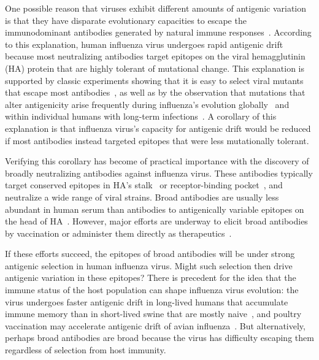 \documentclass[11pt]{article}
\begin{document}
One possible reason that viruses exhibit different amounts of antigenic variation is that they have disparate evolutionary capacities to escape the immunodominant antibodies generated by natural immune responses~\citep{lipsitch2007patterns,cobey2014pathogen,fulton2015mutational}.
According to this explanation, human influenza virus undergoes rapid antigenic drift because most neutralizing antibodies target epitopes on the viral hemagglutinin (HA) protein that are highly tolerant of mutational change.
This explanation is supported by classic experiments showing that it is easy to select viral mutants that escape most antibodies~\citep{yewdell1979antigenic,webster1980determination}, as well as by the observation that mutations that alter antigenicity arise frequently during influenza's evolution globally~\citep{koel2013substitutions,chambers2015identification,petrie2016antibodies,neher2016prediction} and within individual humans with long-term infections~\citep{xue2017parallel}.
A corollary of this explanation is that influenza virus's capacity for antigenic drift would be reduced if most antibodies instead targeted epitopes that were less mutationally tolerant.

Verifying this corollary has become of practical importance with the discovery of broadly neutralizing antibodies against influenza virus.
These antibodies typically target conserved epitopes in HA's stalk~\citep{sui2009structural,ekiert2009antibody,corti2011neutralizing} or receptor-binding pocket~\citep{lee2012heterosubtypic,ekiert2012cross}, and neutralize a wide range of viral strains.
Broad antibodies are usually less abundant in human serum than antibodies to antigenically variable epitopes on the head of HA~\citep{ellebedy2014induction,andrews2015immune}.
However, major efforts are underway to elicit broad antibodies by vaccination or administer them directly as therapeutics~\citep{krammer2015advances,corti2017tackling}.

If these efforts succeed, the epitopes of broad antibodies will be under strong antigenic selection in human influenza virus.
Might such selection then drive antigenic variation in these epitopes?
There is precedent for the idea that the immune status of the host population can shape influenza virus evolution: the virus undergoes faster antigenic drift in long-lived humans that accumulate immune memory than in short-lived swine that are mostly naive~\citep{sheerar1989antigenic,luoh1992hemagglutinin}, and poultry vaccination may accelerate antigenic drift of avian influenza~\citep{lee2004effect,cattoli2011antigenic}.
But alternatively, perhaps broad antibodies are broad because the virus has difficulty escaping them regardless of selection from host immunity.
\end{document}
